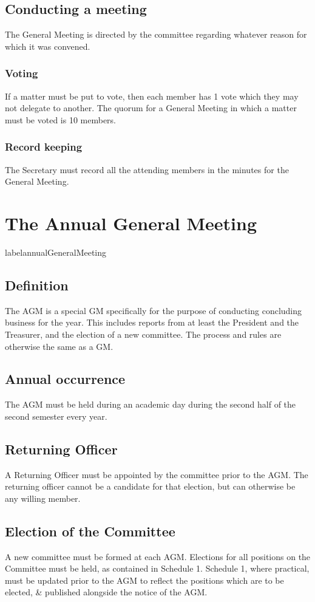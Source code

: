 \documentclass[11pt]{article}
\begin{document}
\subsection{Conducting a meeting}
The General Meeting is directed by the committee regarding whatever reason for which it was convened.
\subsubsection{Voting}
If a matter must be put to vote, then each member has 1 vote which they may not delegate to another. The quorum for a General Meeting in which a matter must be voted is 10 members.
\subsubsection{Record keeping}
The Secretary must record all the attending members in the minutes for the General Meeting.

\section{The Annual General Meeting} label{annualGeneralMeeting}
\subsection{Definition}
The AGM is a special GM specifically for the purpose of conducting concluding business for the year. This includes reports from at least the President and the Treasurer, and the election of a new committee. The process and rules are otherwise the same as a GM.
\subsection{Annual occurrence}
The AGM must be held during an academic day during the second half of the second semester every year.
\subsection{Returning Officer}
A Returning Officer must be appointed by the committee prior to the AGM. The returning officer cannot be a candidate for that election, but can otherwise be any willing member.
\subsection{Election of the Committee}
A new committee must be formed at each AGM. Elections for all positions on the Committee must be held, as contained in Schedule 1. Schedule 1, where practical, must be updated prior to the AGM to reflect the positions which are to be elected, \& published alongside the notice of the AGM.
\end{document}
